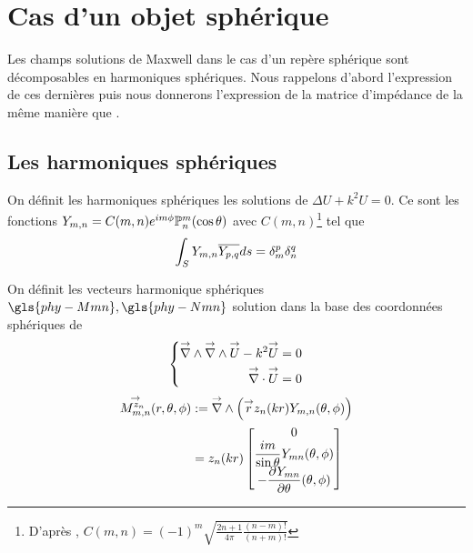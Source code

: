 \section{Cas d'un objet sphérique}

    Les champs solutions de Maxwell dans le cas d'un repère sphérique sont décomposables en harmoniques sphériques. Nous rappelons d'abord l’expression de ces dernières puis nous donnerons l'expression de la matrice d'impédance de la même manière que \cite{cheng_spectral_1993}.

    \subsection{Les harmoniques sphériques}


        On définit les harmoniques sphériques les solutions de \(\Delta U + k^2 U = 0 \). Ce sont les fonctions \(Y_{m,n} = C(m,n) e^{im\phi}\mathbb{P}^m_n(\cos \theta) \) avec \(C(m,n)\)\footnote{D’après \cite[p.~24]{nedelec_acoustic_2001}, \( C(m,n) = (-1)^m\sqrt{\frac{2n+1}{4\pi}\frac{(n-m)!}{(n+m)!}}\)} tel que
        \[
         \displaystyle\int_S Y_{m,n} {\overline{Y_{p,q}}} ds = \delta_m^p \delta_n^q
        \]


         On définit les vecteurs harmonique sphériques\(\gls{phy-Mmn} ,\gls{phy-Nmn}\) solution dans la base des coordonnées sphériques de
        \[
            \left\lbrace
                \begin{aligned}
                    {\overset{\rightarrow}{\nabla}}\wedge {\overset{\rightarrow}{\nabla}}\wedge {\overset{\rightarrow}{U}} - k^2 {\overset{\rightarrow}{U}} = 0\\
                    {\overset{\rightarrow}{\nabla}}\cdot {\overset{\rightarrow}{U}} = 0
                \end{aligned}
            \right.
        \]
        \begin{align}
            \label{eq:defMmn}
            \Mmn[z_n](\rtp) &:= \vrot \left( \vect{r} z_n(kr) Y_{m,n}(\tp) \right)\\
            &= z_n(kr)
            \begin{bmatrix}
                0
                \\
                \frac{im}{\sin\theta}Y_{mn}(\tp)
                \\
                - \ddr{\theta}{Y_{mn}}(\tp)
            \end{bmatrix}
        \end{align}

